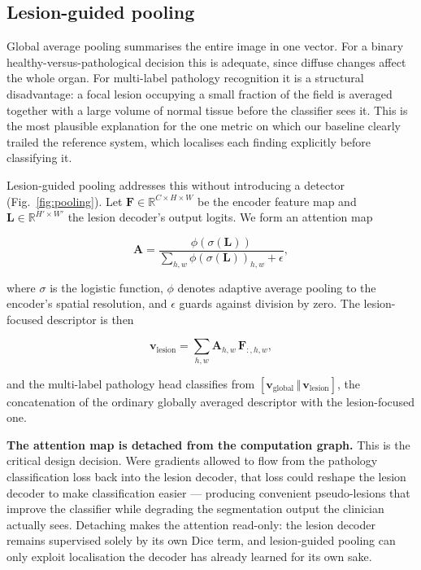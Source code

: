 \documentclass[pdflatex,sn-mathphys-num]{sn-jnl}
\theoremstyle{thmstyleone}%
\theoremstyle{thmstyletwo}%
\theoremstyle{thmstylethree}%
\begin{document}
\subsection{Lesion-guided pooling}\label{subsec:pooling}

Global average pooling summarises the entire image in one vector. For a binary
healthy-versus-pathological decision this is adequate, since diffuse changes affect the whole
organ. For multi-label pathology recognition it is a structural disadvantage: a focal lesion
occupying a small fraction of the field is averaged together with a large volume of normal
tissue before the classifier sees it. This is the most plausible explanation for the one metric
on which our baseline clearly trailed the reference system, which localises each finding
explicitly before classifying it.

Lesion-guided pooling addresses this without introducing a detector
(Fig.~\ref{fig:pooling}). Let $\mathbf{F} \in \mathbb{R}^{C \times H \times W}$ be the encoder
feature map and $\mathbf{L} \in \mathbb{R}^{H' \times W'}$ the lesion decoder's output logits.
We form an attention map

\begin{equation}
\mathbf{A} = \frac{\phi\!\left(\sigma(\mathbf{L})\right)}
                  {\sum_{h,w} \phi\!\left(\sigma(\mathbf{L})\right)_{h,w} + \epsilon},
\label{eq:attention}
\end{equation}

where $\sigma$ is the logistic function, $\phi$ denotes adaptive average pooling to the
encoder's spatial resolution, and $\epsilon$ guards against division by zero. The
lesion-focused descriptor is then

\begin{equation}
\mathbf{v}_{\text{lesion}} = \sum_{h,w} \mathbf{A}_{h,w}\, \mathbf{F}_{:,h,w},
\label{eq:lesionvec}
\end{equation}

and the multi-label pathology head classifies from
$[\mathbf{v}_{\text{global}} \,\Vert\, \mathbf{v}_{\text{lesion}}]$, the concatenation of the
ordinary globally averaged descriptor with the lesion-focused one.

\textbf{The attention map is detached from the computation graph.} This is the critical design
decision. Were gradients allowed to flow from the pathology classification loss back into the
lesion decoder, that loss could reshape the lesion decoder to make classification easier ---
producing convenient pseudo-lesions that improve the classifier while degrading the
segmentation output the clinician actually sees. Detaching makes the attention read-only: the
lesion decoder remains supervised solely by its own Dice term, and lesion-guided pooling can
only exploit localisation the decoder has already learned for its own sake.
\end{document}
